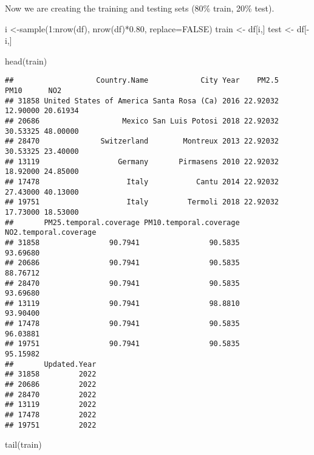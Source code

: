 \documentclass[
]{article}
\newenvironment{Shaded}{\begin{snugshade}}{\end{snugshade}}
\newcommand{\AttributeTok}[1]{\textcolor[rgb]{0.77,0.63,0.00}{#1}}
\newcommand{\ConstantTok}[1]{\textcolor[rgb]{0.00,0.00,0.00}{#1}}
\newcommand{\DecValTok}[1]{\textcolor[rgb]{0.00,0.00,0.81}{#1}}
\newcommand{\FloatTok}[1]{\textcolor[rgb]{0.00,0.00,0.81}{#1}}
\newcommand{\FunctionTok}[1]{\textcolor[rgb]{0.00,0.00,0.00}{#1}}
\newcommand{\NormalTok}[1]{#1}
\newcommand{\OtherTok}[1]{\textcolor[rgb]{0.56,0.35,0.01}{#1}}
\newcommand{\SpecialCharTok}[1]{\textcolor[rgb]{0.00,0.00,0.00}{#1}}
\begin{document}
Now we are creating the training and testing sets (80\% train, 20\%
test).

\begin{Shaded}
\begin{Highlighting}[]
\NormalTok{i }\OtherTok{\textless{}{-}}\FunctionTok{sample}\NormalTok{(}\DecValTok{1}\SpecialCharTok{:}\FunctionTok{nrow}\NormalTok{(df), }\FunctionTok{nrow}\NormalTok{(df)}\SpecialCharTok{*}\FloatTok{0.80}\NormalTok{, }\AttributeTok{replace=}\ConstantTok{FALSE}\NormalTok{)}
\NormalTok{train }\OtherTok{\textless{}{-}}\NormalTok{ df[i,]}
\NormalTok{test }\OtherTok{\textless{}{-}}\NormalTok{ df[}\SpecialCharTok{{-}}\NormalTok{i,]}
\end{Highlighting}
\end{Shaded}

\begin{Shaded}
\begin{Highlighting}[]
\FunctionTok{head}\NormalTok{(train)}
\end{Highlighting}
\end{Shaded}

\begin{verbatim}
##                   Country.Name            City Year    PM2.5     PM10      NO2
## 31858 United States of America Santa Rosa (Ca) 2016 22.92032 12.90000 20.61934
## 20686                   Mexico San Luis Potosi 2018 22.92032 30.53325 48.00000
## 28470              Switzerland        Montreux 2013 22.92032 30.53325 23.40000
## 13119                  Germany       Pirmasens 2010 22.92032 18.92000 24.85000
## 17478                    Italy           Cantu 2014 22.92032 27.43000 40.13000
## 19751                    Italy         Termoli 2018 22.92032 17.73000 18.53000
##       PM25.temporal.coverage PM10.temporal.coverage NO2.temporal.coverage
## 31858                90.7941                90.5835              93.69680
## 20686                90.7941                90.5835              88.76712
## 28470                90.7941                90.5835              93.69680
## 13119                90.7941                98.8810              93.90400
## 17478                90.7941                90.5835              96.03881
## 19751                90.7941                90.5835              95.15982
##       Updated.Year
## 31858         2022
## 20686         2022
## 28470         2022
## 13119         2022
## 17478         2022
## 19751         2022
\end{verbatim}

\begin{Shaded}
\begin{Highlighting}[]
\FunctionTok{tail}\NormalTok{(train)}
\end{Highlighting}
\end{Shaded}
\end{document}

